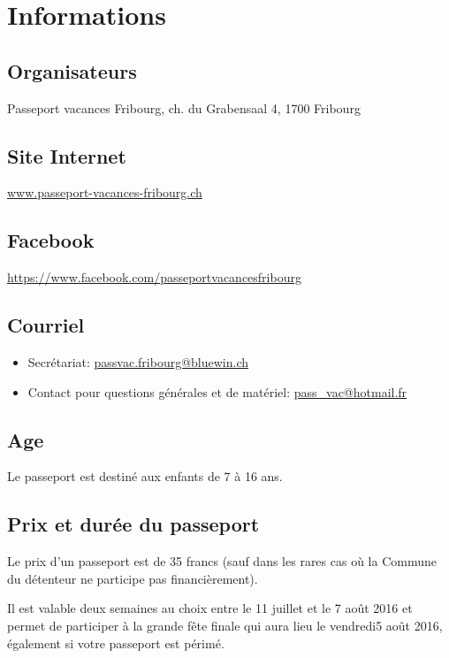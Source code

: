 \chapter{Informations}

\section*{Organisateurs}

Passeport vacances Fribourg, ch. du Grabensaal 4, 1700 Fribourg

\section*{Site Internet}

\url{www.passeport-vacances-fribourg.ch}

\section*{Facebook}

\url{https://www.facebook.com/passeportvacancesfribourg}

\section*{Courriel}

\begin{itemize}
\item Secrétariat: \url{passvac.fribourg@bluewin.ch}
\item Contact pour questions générales et de matériel: \url{pass_vac@hotmail.fr}
\end{itemize}

\section*{Age}

Le passeport est destiné aux enfants de 7 à 16 ans.

\section*{Prix et durée du passeport}

Le prix d'un passeport est de 35 francs (sauf dans les rares cas où la Commune
du détenteur ne participe pas financièrement).

Il est valable deux semaines au choix entre le 11 juillet et le 7 août 2016 et
permet de participer à la grande fête finale qui aura lieu le vendredi5 août
2016, également si votre passeport est périmé.

